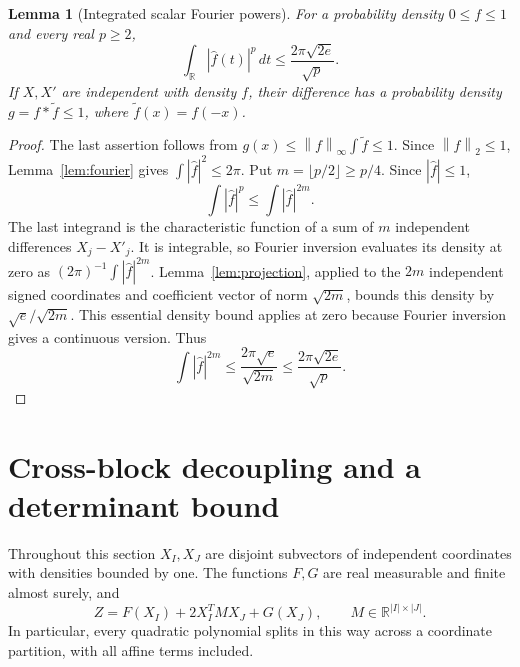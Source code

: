\documentclass[11pt]{article}
\numberwithin{equation}{section}
\newtheorem{lemma}[theorem]{Lemma}
\theoremstyle{definition}\newtheorem{definition}[theorem]{Definition}
\theoremstyle{remark}\newtheorem{remark}[theorem]{Remark}
\newcommand{\R}{\mathbb R}\newcommand{\E}{\mathbb E}\newcommand{\PP}{\mathbb P}
\newcommand{\1}{\mathbf 1}\newcommand{\diag}{\operatorname{diag}}
\newcommand{\norm}[1]{\left\lVert#1\right\rVert}\newcommand{\abs}[1]{\left|#1\right|}
\begin{document}
\begin{lemma}[Integrated scalar Fourier powers]\label{lem:scalar-fourier}
For a probability density $0\le f\le1$ and every real $p\ge2$,
\begin{equation}\label{eq:scalar-fourier}
 \int_\R|\widehat f(t)|^p\,dt\le\frac{2\pi\sqrt{2e}}{\sqrt p}.
\end{equation}
If $X,X'$ are independent with density $f$, their difference has a probability density $g=f*\widetilde f\le1$, where $\widetilde f(x)=f(-x)$.
\end{lemma}
\begin{proof}
The last assertion follows from $g(x)\le\norm f_\infty\int\widetilde f\le1$. Since $\norm f_2\le1$, Lemma~\ref{lem:fourier} gives $\int|\widehat f|^2\le2\pi$. Put $m=\lfloor p/2\rfloor\ge p/4$. Since $|\widehat f|\le1$,
\[
 \int|\widehat f|^p\le\int|\widehat f|^{2m}.
\]
The last integrand is the characteristic function of a sum of $m$ independent differences $X_j-X'_j$. It is integrable, so Fourier inversion evaluates its density at zero as $(2\pi)^{-1}\int|\widehat f|^{2m}$. Lemma~\ref{lem:projection}, applied to the $2m$ independent signed coordinates and coefficient vector of norm $\sqrt{2m}$, bounds this density by $\sqrt e/\sqrt{2m}$. This essential density bound applies at zero because Fourier inversion gives a continuous version. Thus
\[
 \int|\widehat f|^{2m}\le\frac{2\pi\sqrt e}{\sqrt{2m}}
 \le\frac{2\pi\sqrt{2e}}{\sqrt p}.
\]
\end{proof}

\section{Cross-block decoupling and a determinant bound}\label{sec:fourier}
Throughout this section $X_I,X_J$ are disjoint subvectors of independent coordinates with densities bounded by one. The functions $F,G$ are real measurable and finite almost surely, and
\begin{equation}\label{eq:cross-form}
 Z=F(X_I)+2X_I^TMX_J+G(X_J),\qquad M\in\R^{|I|\times|J|}.
\end{equation}
In particular, every quadratic polynomial splits in this way across a coordinate partition, with all affine terms included.
\end{document}
